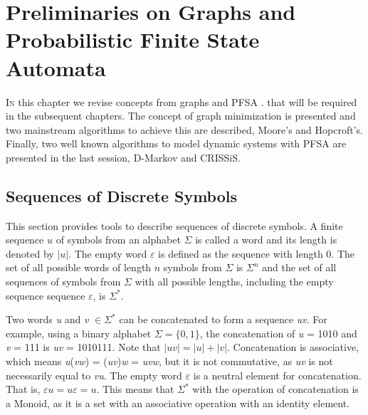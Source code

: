 \chapter{Preliminaries on Graphs and Probabilistic Finite State Automata}\label{cap:2}


{\lettrine[loversize=0.25,findent=0.2em,nindent=0em]{I}{n} this chapter we revise concepts from graphs and PFSA \cite{brianmarcus}\cite{vidal.05}. that will be required in the subsequent chapters. The concept of graph minimization is presented and two mainstream algorithms to achieve this are described, Moore's and Hopcroft's. Finally, two well known algorithms to model dynamic systems with PFSA are presented in the last session, D-Markov and CRISSiS.

\section{Sequences of Discrete Symbols}
This section provides tools to describe sequences of discrete symbols. A finite sequence $u$ of symbols from an alphabet $\Sigma$ is called a word and its length is denoted by $|\textit{u}|$. The empty word $\varepsilon$ is defined as the sequence with length 0. The set of all possible words of length $n$ symbols from $\Sigma$ is $\Sigma^n$ and the set of all sequences of symbols from $\Sigma$ with all possible lengths, including the empty sequence sequence $\varepsilon$, is $\Sigma^*$. 

Two words \textit{u} and \textit{v} $\in \Sigma^*$ can be concatenated to form a sequence \textit{uv}. For example, using a binary alphabet $\Sigma = \{0,1\}$, the concatenation of \textit{u} = 1010 and \textit{v} = 111 is \textit{uv} = 1010111. Note that $|\textit{uv}| = |\textit{u}| + |\textit{v}|$. Concatenation is associative, which means \textit{u}(\textit{vw}) = (\textit{uv})\textit{w} = \textit{uvw}, but it is not commutative, as \textit{uv} is not necessarily equal to \textit{vu}. The empty word $\varepsilon$ is a neutral element for concatenation. That is, $\varepsilon u = u\varepsilon = u$. This means that $\Sigma^*$ with the operation of concatenation is a Monoid, as it is a set with an associative operation with an identity element.

}

